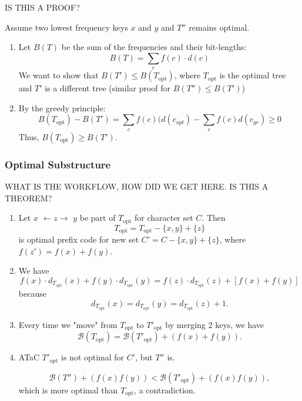 IS THIS A PROOF?
\begin{derivation}
    Assume two lowest frequency keys $x$ and $y$ and $T''$ remains optimal. 
    \vspace{1em}

    \begin{enumerate}
        \item Let $B(T)$ be the sum of the frequencies and their bit-lengths:
        \[
        B(T) = \sum_c f(c) \cdot d(c)
        \]
        We want to show that $B(T') \leq B(T_{\text{opt}})$, where $T_{\text{opt}}$ is the optimal tree and $T'$ is a different tree (similar proof for $B(T'') \leq B(T')$)
        \vspace{1em}
    
        \item By the greedy principle:
        \[
        B(T_{\text{opt}}) - B(T') = \sum_c f(c)(d(c_{opt}) - \sum_c f(c) d(c_{gr}) \geq 0
        \]
        Thus, $B(T_{\text{opt}}) \geq B(T')$.
    \end{enumerate}
\end{derivation}

\subsubsection{Optimal Substructure}
WHAT IS THE WORKFLOW, HOW DID WE GET HERE. IS THIS A THEOREM?
\begin{theorem}
    \begin{enumerate}
        \item Let \( x \) $\leftarrow z \rightarrow$ \( y \) be part of \( T_{\text{opt}} \) for character set \( C \). Then
        \[
        T_{\text{opt}} = T_{\text{opt}} - \{x, y\} + \{z\}
        \]
        is optimal prefix code for new set \( C' = C - \{x, y\} + \{z\} \), where \( f(z') = f(x) + f(y) \).
    
        \item We have
        \[
        f(x) \cdot d_{T_{\text{opt}}}(x) + f(y) \cdot d_{T_{\text{opt}}}(y) = f(z) \cdot d_{T_{\text{opt}}}(z) + [f(x) + f(y)]
        \]
        because 
        \[
        d_{T_{\text{opt}}}(x) = d_{T_{\text{opt}}}(y) = d_{T_{\text{opt}}}(z) + 1.
        \]
    
        \item Every time we "move" from \( T_{\text{opt}} \) to \( T'_{\text{opt}} \) by merging 2 keys, we have
        \[
        \mathcal{B}(T_{\text{opt}}) = \mathcal{B}(T'_{\text{opt}}) + (f(x) + f(y)).
        \]
    
        \item ATaC \( T'_{\text{opt}} \) is not optimal for \( C' \), but \( T'' \) is. 
    
        \[
        \mathcal{B}(T'') + (f(x) f(y)) < \mathcal{B}(T'_{\text{opt}}) + (f(x) f(y)),
        \]
        which is more optimal than \( T_{\text{opt}} \), a contradiction.
    \end{enumerate}

\end{theorem}